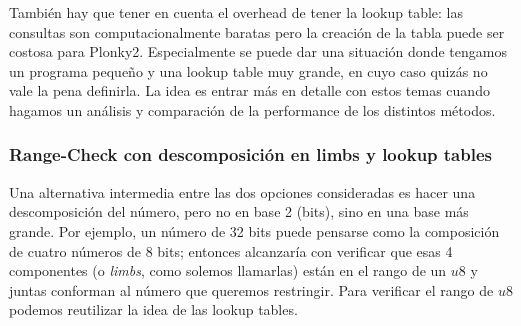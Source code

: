 También hay que tener en cuenta el overhead de tener la lookup table: las consultas son computacionalmente baratas pero la creación de la tabla puede ser costosa para Plonky2. Especialmente se puede dar una situación donde tengamos un programa pequeño y una lookup table muy grande, en cuyo caso quizás no vale la pena definirla. La idea es entrar más en detalle con estos temas cuando hagamos un análisis y comparación de la performance de los distintos métodos.

\subsubsection{\textbf{Range-Check con descomposición en limbs y lookup tables}}
Una alternativa intermedia entre las dos opciones consideradas es hacer una descomposición del número, pero no en base 2 (bits), sino en una base más grande. Por ejemplo, un número de 32 bits puede pensarse como la composición de cuatro números de 8 bits; entonces alcanzaría con verificar que esas 4 componentes (o \textit{limbs}, como solemos llamarlas) están en el rango de un $u8$ y juntas conforman al número que queremos restringir. Para verificar el rango de $u8$ podemos reutilizar la idea de las lookup tables.

